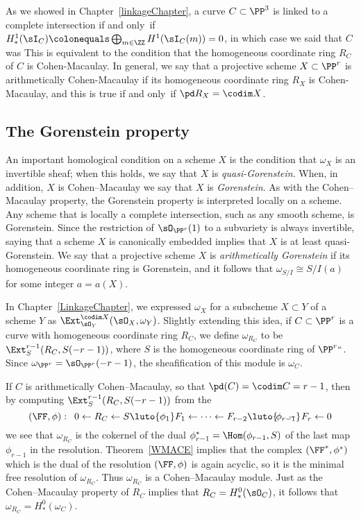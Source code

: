 As we showed in Chapter~\ref{linkageChapter}, a curve $C\subset \PP^3$
is linked to a complete intersection
if and only~if
$H^1_*(\sI_C) \colonequals  \bigoplus_{m\in \ZZ} H^1(\sI_C(m)) = 0$,
in which case we said that $C$ was
%
This is equivalent to the condition that the homogeneous coordinate
ring $R_{C}$ of $C$ is Cohen-Macaulay.
In general, we say that a projective scheme $X\subset \PP^{r}$
is arithmetically Cohen-Macaulay if its homogeneous coordinate ring $R_{X}$
is Cohen-Macaulay, and this is true
if and only~if $\pd R_X = \codim X$. 

\subsection*{The Gorenstein property}
An important homological condition on a scheme $X$ is the condition that
$\omega_X$ is an invertible sheaf; when this holds, we say that $X$
is \emph{quasi-Gorenstein}. When, in addition, $X$ is Cohen--Macaulay
%
%
we say that $X$ is \emph{Gorenstein}. As with the Cohen--Macaulay property,
the Gorenstein property is interpreted locally
on a scheme. 
Any scheme that is locally a
complete intersection, such as any smooth scheme, is Gorenstein. Since
the restriction
of $\sO_{\PP^r}(1)$ to a subvariety is always invertible, saying that
a scheme $X$ is canonically embedded implies that
$X$ is at least quasi-Gorenstein. We say that a projective scheme $X$ is
\emph{arithmetically Gorenstein}
%
if its homogeneous coordinate ring is Gorenstein, and it follows that
$\omega_{S/I} \cong S/I(a)$ for some integer $a = a(X)$.

In Chapter~\ref{LinkageChapter},  we expressed $\omega_X$
for a subscheme $X\subset Y$ of a scheme $Y$ as
$\Ext^{\codim X}_{\sO_Y}(\sO_X, \omega_Y)$. Slightly extending this idea,
if $C\subset \PP^r$ is a curve
with homogeneous coordinate ring $R_{C}$,
we define $\omega_{R_C}$ to be $\Ext^{r-1}_S(R_C, S(-r-1))$, where $S$
is the homogeneous coordinate ring of $\PP^r` `$.
Since $\omega_{\PP^r} = \sO_{\PP^r}(-r-1)$, the sheafification of this
module is  $\omega_C$.

If $C$ is arithmetically Cohen--Macaulay, so that
$\pd (C) = \codim C = r-1$,  then by
computing $\Ext^{r-1}_S(R_C, S(-r-1))$ from the 
%
$$
(\FF, \phi):\quad 
0\leftarrow R_C \leftarrow S\luto{\phi_1} F_1 \leftarrow \cdots \leftarrow 
F_{r-2} \luto{\!\phi_{r-1}}\hskip-15pt-\ F_r\leftarrow 0
$$
we see that $\omega_{R_C}$ is the cokernel of the dual $\phi_{r-1}^{*} = \Hom(\phi_{r-1}, S)$
of the last map $\phi_{r-1}$ in the resolution. 
%
Theorem~\ref{WMACE}
implies that the complex $(\FF^*, \phi^*)$ which is the dual
of the  resolution $(\FF, \phi)$ is again acyclic, so it is the minimal
free resolution of $\omega_{R_C}$. Thus
$\omega_{R_C}$ is a Cohen--Macaulay module. Just as the Cohen--Macaulay
property of
$R_C$ implies that $R_C = H^0_*(\sO_C)$, it follows that $\omega_{R_C}
= H^0_*(\omega_C)$.


